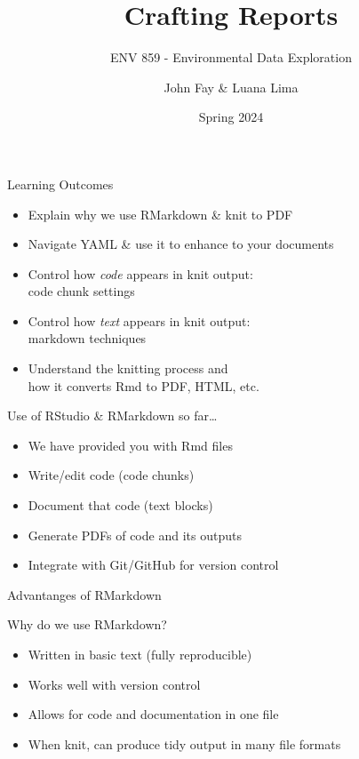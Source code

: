 \documentclass[
  ignorenonframetext,
]{beamer}
\title{Crafting Reports}
\subtitle{ENV 859 - Environmental Data Exploration}
\author{John Fay \& Luana Lima}
\date{Spring 2024}
\providecommand{\tightlist}{%
  \setlength{\itemsep}{0pt}\setlength{\parskip}{0pt}}
\begin{document}
\frame{\titlepage}

\begin{frame}{Learning Outcomes}
\protect\hypertarget{learning-outcomes}{}
\begin{itemize}
\tightlist
\item
  Explain why we use RMarkdown \& knit to PDF
\item
  Navigate YAML \& use it to enhance to your documents
\item
  Control how \emph{code} appears in knit output:\\
  code chunk settings
\item
  Control how \emph{text} appears in knit output:\\
  markdown techniques
\item
  Understand the knitting process and\\
  how it converts Rmd to PDF, HTML, etc.
\end{itemize}
\end{frame}

\begin{frame}{Use of RStudio \& RMarkdown so far\ldots{}}
\protect\hypertarget{use-of-rstudio-rmarkdown-so-far}{}
\begin{itemize}
\tightlist
\item
  We have provided you with Rmd files
\item
  Write/edit code (code chunks)
\item
  Document that code (text blocks)
\item
  Generate PDFs of code and its outputs
\item
  Integrate with Git/GitHub for version control
\end{itemize}
\end{frame}

\begin{frame}{Advantanges of RMarkdown}
\protect\hypertarget{advantanges-of-rmarkdown}{}
\begin{block}{Why do we use RMarkdown?}
\protect\hypertarget{why-do-we-use-rmarkdown}{}
\begin{itemize}
\tightlist
\item
  Written in basic text (fully reproducible)
\item
  Works well with version control
\item
  Allows for code and documentation in one file
\item
  When knit, can produce tidy output in many file formats
\end{itemize}
\end{block}
\end{frame}
\end{document}
